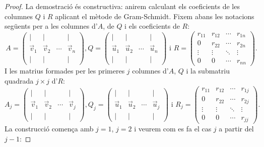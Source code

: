 \documentclass[
  11pt,
]{book}
\numberwithin{dummy}{section}
\theoremstyle{maincolornumbox}
\theoremstyle{blacknumex}
\theoremstyle{blacknumbox}
\theoremstyle{maincolornum}
\begin{document}
\begin{proof}

La demostració és constructiva: anirem calculant els
coeficients de les columnes \(Q\) i \(R\) aplicant el mètode de
Gram-Schmidt. Fixem abans les notacions següents per a les columnes
d'\(A\), de \(Q\) i els coeficients de \(R\):
\[A=\begin{pmatrix} | & | & & | \\ \vec v_1 & \vec v_2 & \cdots & \vec v_n \\ | & | & & | \end{pmatrix} ,
Q=\begin{pmatrix} | & | & & | \\ \vec u_1 & \vec u_2 & \cdots & \vec u_n \\ | & | & & | \end{pmatrix} 
\text{ i }
R=\begin{pmatrix} r_{11} & r_{12} & \cdots & r_{1n} \\ 0 & r_{22} & \cdots & r_{2n} \\ \vdots & \vdots & \ddots & \vdots \\ 0 & 0 & \cdots & r_{nn}\end{pmatrix}.\]
I les matrius formades per les primeres \(j\) columnes d'\(A\), \(Q\) i la
submatriu quadrada \(j\times j\) d'\(R\):
\[A_j=\begin{pmatrix} | & | & & | \\ \vec v_1 & \vec v_2 & \cdots & \vec v_j\\ | & | & & | \end{pmatrix} ,
Q_j=\begin{pmatrix} | & | & & | \\ \vec u_1 & \vec u_2 & \cdots & \vec u_j \\ | & | & & | \end{pmatrix} 
\text{ i }
R_j=\begin{pmatrix} r_{11} & r_{12} & \cdots & r_{1j} \\ 0 & r_{22} & \cdots & r_{2j} \\ \vdots & \vdots & \ddots & \vdots \\ 0 & 0 & \cdots & r_{jj}\end{pmatrix}.\]
La construcció comença amb \(j=1\), \(j=2\) i veurem com es fa el cas \(j\) a
partir del \(j-1\):


\end{proof}
\end{document}

